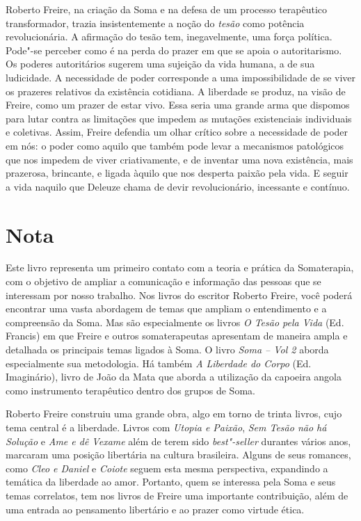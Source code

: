 Roberto Freire, na criação da Soma e na defesa de um processo
terapêutico transformador, trazia insistentemente a noção do
\emph{tesão} como potência revolucionária. A afirmação do tesão tem,
inegavelmente, uma força política. Pode"-se perceber como é na perda do
prazer em que se apoia o autoritarismo. Os poderes autoritários sugerem
uma sujeição da vida humana, a de sua ludicidade. A necessidade de poder
corresponde a uma impossibilidade de se viver os prazeres relativos da
existência cotidiana. A liberdade se produz, na visão de Freire, como um
prazer de estar vivo. Essa seria uma grande arma que dispomos para lutar
contra as limitações que impedem as mutações existenciais individuais e
coletivas. Assim, Freire defendia um olhar crítico sobre a necessidade
de poder em nós: o poder como aquilo que também pode levar a mecanismos
patológicos que nos impedem de viver criativamente, e de inventar uma
nova existência, mais prazerosa, brincante, e ligada àquilo que nos
desperta paixão pela vida. E seguir a vida naquilo que Deleuze chama de
devir revolucionário, incessante e contínuo.

\chapter{Nota}

Este livro representa um primeiro contato com a teoria e prática da
Somaterapia, com o objetivo de ampliar a comunicação e informação das
pessoas que se interessam por nosso trabalho. Nos livros do escritor
Roberto Freire, você poderá encontrar uma vasta abordagem de temas que
ampliam o entendimento e a compreensão da Soma. Mas são especialmente os
livros \emph{O Tesão pela Vida} (Ed. Francis) em que Freire e outros
somaterapeutas apresentam de maneira ampla e detalhada os principais
temas ligados à Soma. O livro \emph{Soma -- Vol 2} aborda especialmente sua
metodologia. Há também \emph{A Liberdade do Corpo} (Ed. Imaginário), livro
de João da Mata que aborda a utilização da capoeira angola como
instrumento terapêutico dentro dos grupos de Soma.

Roberto Freire construiu uma grande obra, algo em torno de trinta
livros, cujo tema central é a liberdade. Livros com \emph{Utopia e Paixão},
\emph{Sem Tesão não há Solução} e \emph{Ame e dê Vexame} além de terem sido
\emph{best"-seller} durantes vários anos, marcaram uma posição libertária
na cultura brasileira. Alguns de seus romances, como \emph{Cleo e Daniel} e
\emph{Coiote} seguem esta mesma perspectiva, expandindo a temática da
liberdade ao amor. Portanto, quem se interessa pela Soma e seus temas
correlatos, tem nos livros de Freire uma importante contribuição, além
de uma entrada ao pensamento libertário e ao prazer como virtude ética.

